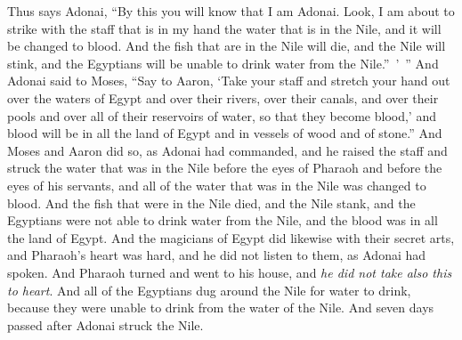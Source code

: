 \begin{biblechapter}
\verse Thus says Adonai, “By this you will know that I am Adonai. Look, I am about to strike with the staff that is in my hand the water that is in the Nile, and it will be changed to blood.
\verse And the fish that are in the Nile will die, and the Nile will stink, and the Egyptians will be unable to drink water from the Nile.” ’ ”
\verse And Adonai said to Moses, “Say to Aaron, ‘Take your staff and stretch your hand out over the waters of Egypt and over their rivers, over their canals, and over their pools and over all of their reservoirs of water, so that they become blood,’ and blood will be in all the land of Egypt and in vessels of wood and of stone.”
\verse And Moses and Aaron did so, as Adonai had commanded, and he raised the staff and struck the water that was in the Nile before the eyes of Pharaoh and before the eyes of his servants, and all of the water that was in the Nile was changed to blood.
\verse And the fish that were in the Nile died, and the Nile stank, and the Egyptians were not able to drink water from the Nile, and the blood was in all the land of Egypt.
\verse And the magicians of Egypt did likewise with their secret arts, and Pharaoh’s heart was hard, and he did not listen to them, as Adonai had spoken.
\verse And Pharaoh turned and went to his house, and \textit{he did not take also this to heart}.
\verse And all of the Egyptians dug around the Nile for water to drink, because they were unable to drink from the water of the Nile.
\verse And seven days passed after Adonai struck the Nile.
\end{biblechapter}

